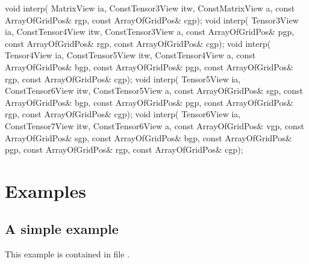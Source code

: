\begin{code}
void interp( MatrixView            ia,
             ConstTensor3View      itw,
             ConstMatrixView       a,   
             const ArrayOfGridPos& rgp,
             const ArrayOfGridPos& cgp);
void interp( Tensor3View           ia,
             ConstTensor4View      itw,
             ConstTensor3View      a,   
             const ArrayOfGridPos& pgp,
             const ArrayOfGridPos& rgp,
             const ArrayOfGridPos& cgp);
void interp( Tensor4View           ia,
             ConstTensor5View      itw,
             ConstTensor4View      a,   
             const ArrayOfGridPos& bgp,
             const ArrayOfGridPos& pgp,
             const ArrayOfGridPos& rgp,
             const ArrayOfGridPos& cgp);
void interp( Tensor5View           ia,
             ConstTensor6View      itw,
             ConstTensor5View      a,   
             const ArrayOfGridPos& sgp,
             const ArrayOfGridPos& bgp,
             const ArrayOfGridPos& pgp,
             const ArrayOfGridPos& rgp,
             const ArrayOfGridPos& cgp);
void interp( Tensor6View           ia,
             ConstTensor7View      itw,
             ConstTensor6View      a,   
             const ArrayOfGridPos& vgp,
             const ArrayOfGridPos& sgp,
             const ArrayOfGridPos& bgp,
             const ArrayOfGridPos& pgp,
             const ArrayOfGridPos& rgp,
             const ArrayOfGridPos& cgp);
\end{code}

\section{Examples}

\subsection{A simple example}

This example is contained in file .


